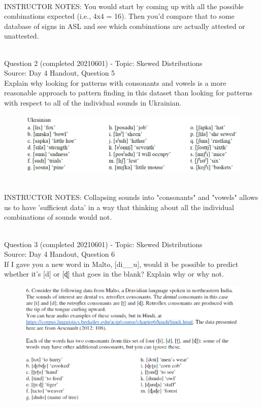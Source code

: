 \documentclass[12pt]{article}
\begin{document}
~\\
INSTRUCTOR NOTES: You would start by coming up with all the possible combinations expected (i.e., 4x4 = 16). Then you'd compare that to some database of signs in ASL and see which combinations are actually attested or unattested.


~\\

{\large Question 2} (completed 20210601) - Topic: Skewed Distributions\\
Source: Day 4 Handout, Question 5\\

Explain why looking for patterns with consonants and vowels is a more reasonable approach to pattern finding in this dataset than looking for patterns with respect to all of the individual sounds in Ukrainian.\\

\begin{figure}[H]
\includegraphics{../images/ukrainian.png}
\end{figure}

~\\
INSTRUCTOR NOTES: Collapsing sounds into "consonants" and "vowels" allows us to have 'sufficient data' in a way that thinking about all the individual combinations of sounds would not.


~\\

{\large Question 3} (completed 20210601) - Topic: Skewed Distributions\\
Source: Day 4 Handout, Question 6\\

If I gave you a new word in Malto, [di\_\_u], would it be possible to predict whether it's [d] or [ɖ] that goes in the blank? Explain why or why not.\\

\begin{figure}[H]
\includegraphics{../images/malto.png}
\end{figure}
\end{document}
